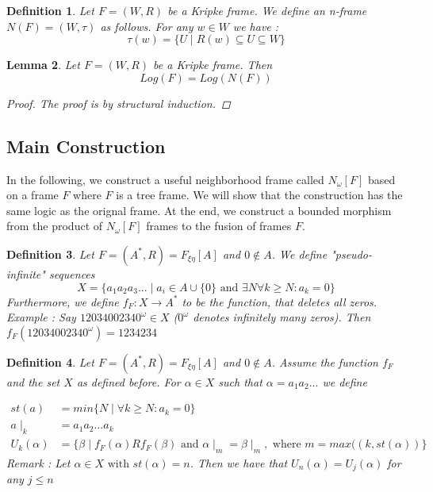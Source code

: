 \documentclass[12pt, a4paper]{scrartcl}
\newtheorem{definition}{Definition}[subsection]
\newtheorem{lemma}[definition]{Lemma}
\begin{document}
\begin{definition}
    Let $F = (W,R)$ be a Kripke frame. We define an n-frame $N(F) = (W, \tau)$ as follows.
    For any $w\in W$ we have :
    $$\tau(w) = \{ U \mid R(w) \subseteq U \subseteq W \}$$
        
\end{definition}

\begin{lemma}

    Let $F = (W,R)$ be a Kripke frame. Then $$Log(F) = Log(N(F))$$ 
    \begin{proof}
        The proof is by structural induction.
    \end{proof}
\end{lemma}


\subsection{Main Construction}
In the following, we construct a useful neighborhood frame called $N_\omega[F]$ based on a frame $F$ where $F$ is a tree frame.
We will show that the construction has the same logic as the orignal frame. 
At the end, we construct a bounded morphism from the product of $N_\omega[F]$ frames to the fusion of frames $F$.


\begin{definition}
    Let $F = (A^*, R) = F_{\xi \eta}[A]$ and $0 \notin A$. We define "pseudo-infinite" sequences 
    $$X = \{a_1a_2a_3... \mid a_i \in A \cup \{0\} \mbox{ and } \exists N \forall k \geq N : a_k = 0\}$$
    Furthermore, we define $f_F : X \rightarrow A^*$ to be the function, that deletes all zeros. \newline \newline
    Example : Say $12034002340^\omega \in X$ ($0^\omega$ denotes infinitely many zeros). Then $f_F(12034002340^\omega) = 1234234$

\end{definition}

\begin{definition}
    Let $F = (A^*, R) = F_{\xi \eta}[A]$ and $0 \notin A$. Assume the function $f_F$ and the set $X$ as defined before.
    For $\alpha \in X$ such that $\alpha = a_1a_2...$ we define 
    
    \begin{align*}
            st(a) &= min\{N \mid \forall k \geq N : a_k = 0\} \\
            a \mid_{k} &= a_1a_2...a_k \\
            U_k(\alpha) &= \{ \beta \mid f_F(\alpha)Rf_F(\beta) \mbox{ and } \alpha \mid_m = \beta \mid_m,  \mbox{ where } m = max((k, st(\alpha))\} 
    \end{align*} 
    Remark : Let $\alpha \in X \mbox{ with } st(\alpha) = n$. Then we have that $U_n(\alpha) = U_j(\alpha)$ for any $j \leq n$

\end{definition}
\end{document}
